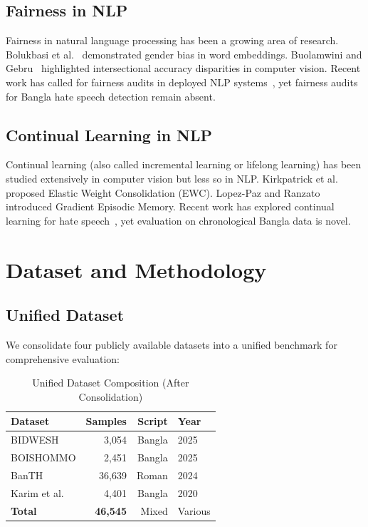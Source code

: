 \documentclass[conference]{IEEEtran}
\begin{document}
\subsection{Fairness in NLP}

Fairness in natural language processing has been a growing area of research. Bolukbasi et al.~\cite{bolukbasi2016man} demonstrated gender bias in word embeddings. Buolamwini and Gebru~\cite{buolamwini2018gender} highlighted intersectional accuracy disparities in computer vision. Recent work has called for fairness audits in deployed NLP systems~\cite{raji2020closing}, yet fairness audits for Bangla hate speech detection remain absent.

\subsection{Continual Learning in NLP}

Continual learning (also called incremental learning or lifelong learning) has been studied extensively in computer vision but less so in NLP. Kirkpatrick et al.~\cite{kirkpatrick2017overcoming} proposed Elastic Weight Consolidation (EWC). Lopez-Paz and Ranzato~\cite{lopez2017gradient} introduced Gradient Episodic Memory. Recent work has explored continual learning for hate speech~\cite{wang2021continual}, yet evaluation on chronological Bangla data is novel.

\section{Dataset and Methodology}

\subsection{Unified Dataset}

We consolidate four publicly available datasets into a unified benchmark for comprehensive evaluation:

\begin{table}[h]
\centering
\caption{Unified Dataset Composition (After Consolidation)}
\begin{tabular}{lrrl}
\toprule
\textbf{Dataset} & \textbf{Samples} & \textbf{Script} & \textbf{Year} \\
\midrule
BIDWESH & 3,054 & Bangla & 2025 \\
BOISHOMMO & 2,451 & Bangla & 2025 \\
BanTH & 36,639 & Roman & 2024 \\
Karim et al. & 4,401 & Bangla & 2020 \\
\midrule
\textbf{Total} & \textbf{46,545} & Mixed & Various \\
\bottomrule
\end{tabular}
\end{table}
\end{document}
